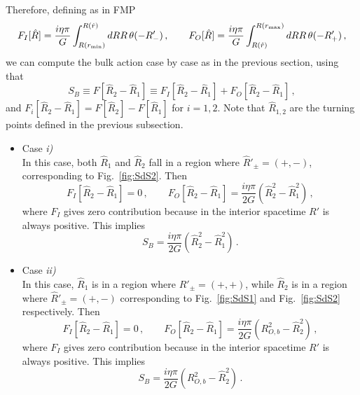 \documentclass[a4paper,11pt]{article}
\numberwithin{equation}{section}
\numberwithin{equation}{section}
\begin{document}
Therefore, defining as in FMP
\begin{equation}
F_I[\hat{R}] = \frac{i \eta \pi}{G} \int_{R(r_{\rm min})}^{R(\hat{r})} dR R \, \theta(-R'_-) \,, \qquad F_O[\hat{R}] = \frac{i \eta \pi}{G} \int_{R(\hat{r})}^{R(r_{\rm max})} dR R \, \theta(-R'_+) \,,
\end{equation}
we can compute the bulk action case by case as in the previous section, using that
\begin{equation}
S_B \equiv F[\hat{R}_2 - \hat{R}_1] \equiv F_I[\hat{R}_2 - \hat{R}_1] + F_O[\hat{R}_2 - \hat{R}_1] \,,
\end{equation}
and $F_i[\hat{R}_2 - \hat{R}_1] = F[\hat{R}_2] - F[\hat{R}_1]$ for $i = 1,2$. Note that $\hat{R}_{1,2}$ are the turning points defined in the previous subsection.

\begin{itemize}[leftmargin=*]
\item[]{Case \textit{i)}}\\
In this case, both $\hat{R}_1$ and $\hat{R}_2$ fall in a region where $\hat{R}'_\pm = (+, -)$, corresponding to Fig.~\ref{fig:SdS2}. Then
\begin{equation}
F_I[\hat{R}_2 - \hat{R}_1] = 0 \,, \qquad F_O[\hat{R}_2 - \hat{R}_1] = \frac{i \eta \pi}{2G} \left(\hat{R}_2^2 - \hat{R}_1^2\right) \,,
\end{equation}
where $F_I$ gives zero contribution because in the interior spacetime $R'$ is always positive. This implies
\begin{equation}
S_B = \frac{i \eta \pi}{2G} \left(\hat{R}_2^2 - \hat{R}_1^2\right) \,.
\end{equation}
\item[]{Case \textit{ii)}}\\
In this case, $\hat{R}_1$ is in a region where $\hat{R}'_\pm = (+, +)$, while $\hat{R}_2$ is in a region where $\hat{R}'_\pm = (+, -)$ corresponding to Fig.~\ref{fig:SdS1} and Fig.~\ref{fig:SdS2} respectively. Then
\begin{equation}
F_I[\hat{R}_2 - \hat{R}_1] = 0 \,, \qquad F_O[\hat{R}_2 - \hat{R}_1] = \frac{i \eta \pi}{2G} \left(R_{O, b}^2 - \hat{R}_2^2\right) \,,
\end{equation}
where $F_I$ gives zero contribution because in the interior spacetime $R'$ is always positive. This implies
\begin{equation}
S_B = \frac{i \eta \pi}{2G} \left(R_{O, b}^2 - \hat{R}_2^2\right) \,.
\end{equation}


\end{itemize}
\end{document}
